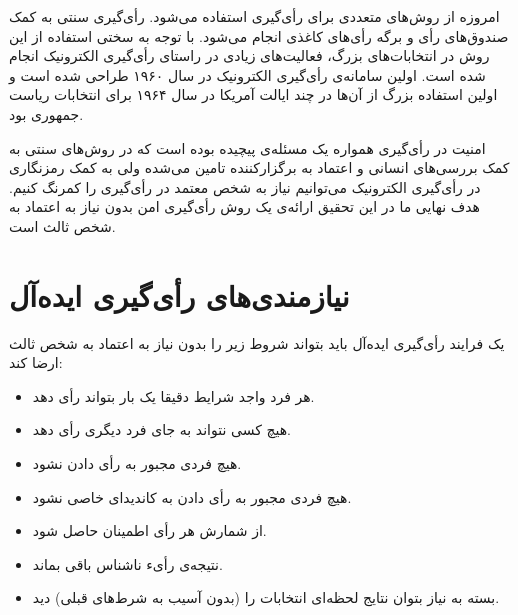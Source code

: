 \par
امروزه از روش‌های متعددی برای رأی‌گیری استفاده می‌شود. رأی‌گیری سنتی به کمک صندوق‌های رأی‌ و برگه‌ رأی‌های کاغذی انجام می‌شود. با توجه به سختی استفاده از این روش در انتخابات‌های بزرگ، فعالیت‌های زیادی در راستای رأی‌گیری الکترونیک انجام شده است. اولین سامانه‌ی رأی‌گیری الکترونیک در سال ۱۹۶۰ طراحی شده است و اولین استفاده‌ بزرگ از آن‌ها در چند ایالت آمریکا در سال ۱۹۶۴ برای انتخابات ریاست جمهوری بود. 

\par
امنیت در رأی‌گیری همواره یک مسئله‌ی پیچیده بوده است که در روش‌های سنتی به کمک بررسی‌های انسانی و اعتماد به برگزارکننده تامین می‌شده ولی به کمک رمزنگاری در رأی‌گیری الکترونیک می‌توانیم نیاز به شخص معتمد در رأی‌گیری را کمرنگ کنیم. هدف نهایی ما در این تحقیق ارائه‌ی یک روش رأی‌گیری امن بدون نیاز به اعتماد به شخص ثالث است. 
\section{نیازمندی‌های رأی‌گیری ایده‌آل}

یک فرایند‌ رأی‌گیری ایده‌آل باید بتواند شروط زیر را بدون نیاز به اعتماد به شخص ثالث ارضا کند:
\begin{itemize}
	\item 
	هر فرد واجد شرایط دقیقا یک بار بتواند رأی دهد.
	\item 
	هیچ کسی نتواند به جای فرد دیگری رأی دهد.
	\item 
  	هیچ فردی مجبور به رأی دادن نشود.
  	\item 
  	هیچ فردی مجبور به رأی دادن به کاندیدای خاصی نشود.
  	\item 
  	از شمارش هر رأی اطمینان حاصل شود.
  	\item 
    نتیجه‌ی رأیء ناشناس  باقی بماند. 
  	\item 
  	بسته به نیاز بتوان نتایج لحظه‌ای انتخابات را (بدون آسیب به شرط‌های قبلی) دید.
\end{itemize}

